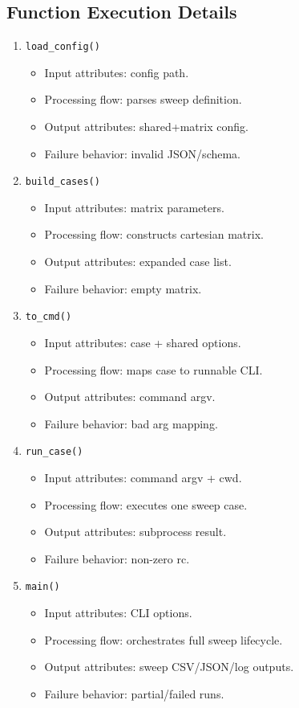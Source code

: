 \documentclass[11pt,a4paper]{article}
\begin{document}
\subsection*{Function Execution Details}
\begin{enumerate}[leftmargin=*]
  \item \texttt{load\_config()}
  \begin{itemize}[leftmargin=*]
    \item Input attributes: config path.
    \item Processing flow: parses sweep definition.
    \item Output attributes: shared+matrix config.
    \item Failure behavior: invalid JSON/schema.
  \end{itemize}
  \item \texttt{build\_cases()}
  \begin{itemize}[leftmargin=*]
    \item Input attributes: matrix parameters.
    \item Processing flow: constructs cartesian matrix.
    \item Output attributes: expanded case list.
    \item Failure behavior: empty matrix.
  \end{itemize}
  \item \texttt{to\_cmd()}
  \begin{itemize}[leftmargin=*]
    \item Input attributes: case + shared options.
    \item Processing flow: maps case to runnable CLI.
    \item Output attributes: command argv.
    \item Failure behavior: bad arg mapping.
  \end{itemize}
  \item \texttt{run\_case()}
  \begin{itemize}[leftmargin=*]
    \item Input attributes: command argv + cwd.
    \item Processing flow: executes one sweep case.
    \item Output attributes: subprocess result.
    \item Failure behavior: non-zero rc.
  \end{itemize}
  \item \texttt{main()}
  \begin{itemize}[leftmargin=*]
    \item Input attributes: CLI options.
    \item Processing flow: orchestrates full sweep lifecycle.
    \item Output attributes: sweep CSV/JSON/log outputs.
    \item Failure behavior: partial/failed runs.
  \end{itemize}
\end{enumerate}
\end{document}
